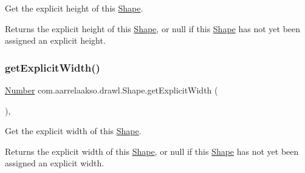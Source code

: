 Get the explicit height of this \hyperlink{classcom_1_1aarrelaakso_1_1drawl_1_1_shape}{Shape}. 

\begin{DoxyReturn}{Returns}
the explicit height of this \hyperlink{classcom_1_1aarrelaakso_1_1drawl_1_1_shape}{Shape}, or {\ttfamily null} if this \hyperlink{classcom_1_1aarrelaakso_1_1drawl_1_1_shape}{Shape} has not yet been assigned an explicit height. 
\end{DoxyReturn}
\mbox{\label{classcom_1_1aarrelaakso_1_1drawl_1_1_shape_aca08f18bbe102a5cf6a77cb746d42875}} 
\subsubsection{\texorpdfstring{get\+Explicit\+Width()}{getExplicitWidth()}}
{\footnotesize\ttfamily \hyperlink{interfacecom_1_1aarrelaakso_1_1drawl_1_1_number}{Number} com.\+aarrelaakso.\+drawl.\+Shape.\+get\+Explicit\+Width (\begin{DoxyParamCaption}{ }\end{DoxyParamCaption})\hspace{0.3cm}{\ttfamily [protected]}, {\ttfamily [inherited]}}



Get the explicit width of this \hyperlink{classcom_1_1aarrelaakso_1_1drawl_1_1_shape}{Shape}. 

\begin{DoxyReturn}{Returns}
the explicit width of this \hyperlink{classcom_1_1aarrelaakso_1_1drawl_1_1_shape}{Shape}, or {\ttfamily null} if this \hyperlink{classcom_1_1aarrelaakso_1_1drawl_1_1_shape}{Shape} has not yet been assigned an explicit width. 
\end{DoxyReturn}
\mbox{\label{classcom_1_1aarrelaakso_1_1drawl_1_1_shape_aa1fbd5a290bc5d2df437f0bd79f30a89}} 
